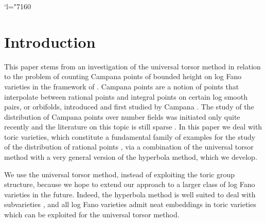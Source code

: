 \documentclass[11pt]{article}
\numberwithin{equation}{section}
\newcommand{\Changel}{\mathcode`l="7160}
\theoremstyle{definition}
\numberwithin{theorem}{section}
\begin{document}
\Changel

\section{Introduction}

This paper stems from an investigation of the universal torsor method \cite{MR1679841, MR3552013} in relation to the problem of counting Campana points of bounded height on log Fano varieties in the framework of \cite[Conj.\,1.1]{PSTVA}.
Campana points are a notion of points that interpolate between rational points and integral points on certain log smooth pairs, or orbifolds, introduced and first studied by Campana \cite{MR2097416, MR2831280, MR3477539}. The study of the distribution of Campana points over number fields was initiated only quite recently and the literature on this topic is still sparse \cite{MR2931315, MR2968632, BY, Shute2, PSTVA, Shute, Streeter, Xiao, BBKOPWproc}.
In this paper we deal with toric varieties, which constitute a fundamental family of examples for the study of the distribution of rational points \cite{MR1353919, MR1369408, MR1423638, MR1620682, MR1679841, Bre01b}, via a combination of the universal torsor method with a very general version of the hyperbola method, which we develop.

We use the universal torsor method, instead of exploiting the toric group structure, because we hope to extend our approach to a larger class of log Fano varieties in the future. Indeed,
the hyperbola method is well suited to deal with subvarieties \cite{MR3320489, Sch, MR3731304, BB, mignot1, Mignot, mignot2, BroHu}, and all log Fano varieties admit neat embeddings in toric varieties \cite{MR3307753, MR3275656} which can be exploited for the universal torsor method.\par
\end{document}
